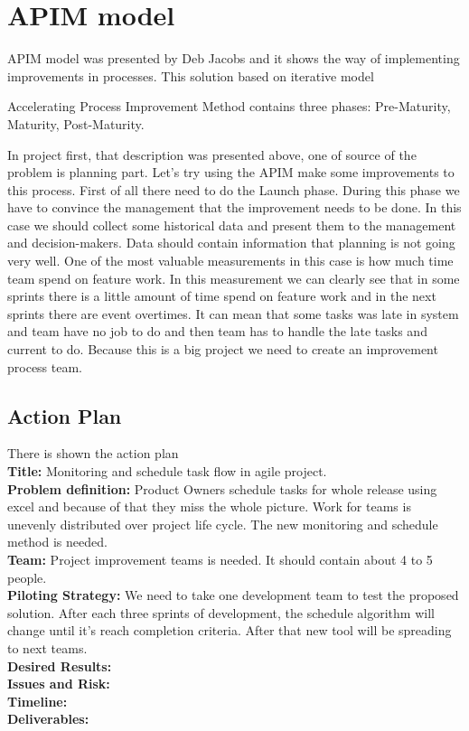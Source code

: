 \section{APIM model}

APIM model was presented by Deb Jacobs and it shows the way of implementing improvements in processes. This solution based on iterative model

Accelerating Process Improvement Method contains three phases: Pre-Maturity, Maturity, Post-Maturity. 

In project first, that description was presented above, one of source of the problem is planning part. Let's try using the APIM make some improvements to this process.  First of all there need to do the Launch phase. During this phase we have to convince the management that the improvement needs to be done. In this case we should collect some historical data and present them to the management and decision-makers. Data should contain information that planning is not going very well. One of the most valuable measurements in this case is how much time team spend on feature work. In this measurement we can clearly see that in some sprints there is a little amount of time spend on feature work and in the next sprints there are event overtimes. It can mean that some tasks was late in system and team have no job to do and then team has to handle the late tasks and current to do. Because this is a big project we need to create an improvement process team. \\

\subsection*{Action Plan}
There is shown the action plan\\
\textbf{Title:}  Monitoring and schedule task flow in agile project.\\
\textbf{Problem definition:} Product Owners schedule tasks for whole release using excel and because of that they miss the whole picture. Work for teams is unevenly distributed over project life cycle. The new monitoring and schedule method is needed.\\
\textbf{Team:} Project improvement teams is needed. It should contain about 4 to 5 people.\\
\textbf{Piloting Strategy:} We need to take one development team to test the proposed solution. After each three sprints of development, the schedule algorithm will change until it's reach completion criteria. After that new tool will be spreading to next teams.\\
\textbf{Desired Results:} \\
\textbf{Issues and Risk:} \\
\textbf{Timeline:} \\
\textbf{Deliverables:} 